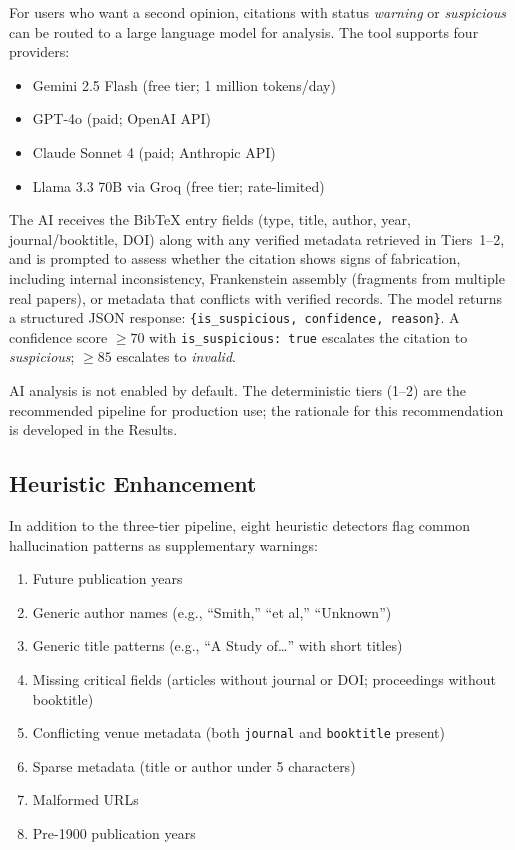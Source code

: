 For users who want a second opinion, citations with status \textit{warning} or \textit{suspicious} can be routed to a large language model for analysis. The tool supports four providers:

\begin{itemize}
  \item Gemini 2.5 Flash (free tier; 1 million tokens/day)
  \item GPT-4o (paid; OpenAI API)
  \item Claude Sonnet 4 (paid; Anthropic API)
  \item Llama 3.3 70B via Groq (free tier; rate-limited)
\end{itemize}

The AI receives the BibTeX entry fields (type, title, author, year, journal/booktitle, DOI) along with any verified metadata retrieved in Tiers~1--2, and is prompted to assess whether the citation shows signs of fabrication, including internal inconsistency, Frankenstein assembly (fragments from multiple real papers), or metadata that conflicts with verified records. The model returns a structured JSON response: \texttt{\{is\_suspicious, confidence, reason\}}. A confidence score $\geq 70$ with \texttt{is\_suspicious: true} escalates the citation to \textit{suspicious}; $\geq 85$ escalates to \textit{invalid}.

AI analysis is not enabled by default. The deterministic tiers (1--2) are the recommended pipeline for production use; the rationale for this recommendation is developed in the Results.

\subsection{Heuristic Enhancement}

In addition to the three-tier pipeline, eight heuristic detectors flag common hallucination patterns as supplementary warnings:
\vspace{-0.5em}
\begin{enumerate}[itemsep=0.1em]
  \item Future publication years
  \item Generic author names (e.g., ``Smith,'' ``et al,'' ``Unknown'')
  \item Generic title patterns (e.g., ``A Study of\ldots'' with short titles)
  \item Missing critical fields (articles without journal or DOI; proceedings without booktitle)
  \item Conflicting venue metadata (both \texttt{journal} and \texttt{booktitle} present)
  \item Sparse metadata (title or author under 5 characters)
  \item Malformed URLs
  \item Pre-1900 publication years
\end{enumerate}

